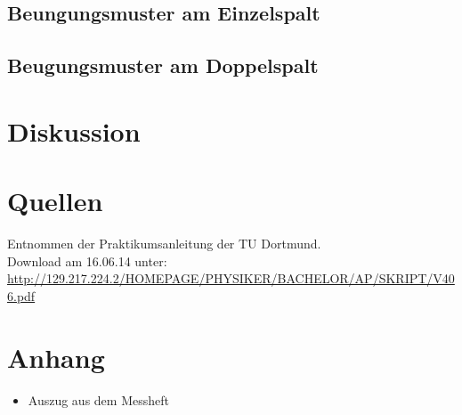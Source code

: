 \documentclass[11pt,ngerman,a4paper]{article}
\begin{document}
\subsection{Beungungsmuster am Einzelspalt}
\subsection{Beugungsmuster am Doppelspalt}
\section{Diskussion}

\section{Quellen}
\begin{enumerate}[{[}1{]}]
\item Entnommen der Praktikumsanleitung \textit{} der TU Dortmund. \\
Download am 16.06.14 unter:\\
 \url{http://129.217.224.2/HOMEPAGE/PHYSIKER/BACHELOR/AP/SKRIPT/V406.pdf}
\end{enumerate}
\section{Anhang}
\begin{itemize}
\item Auszug aus dem Messheft
\end{itemize}
\end{document}
